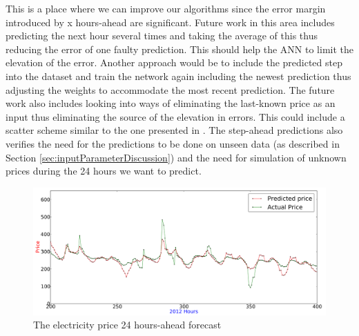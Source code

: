 This is a place where we can improve our algorithms since the error margin introduced by x hours-ahead are significant. Future work in this area includes predicting the next hour several times and taking the average of this thus reducing the error of one faulty prediction. This should help the ANN to limit the elevation of the error. Another approach would be to include the predicted step into the dataset and train the network again including the newest prediction thus adjusting the weights to accommodate the most recent prediction. The future work also includes looking into ways of eliminating the last-known price as an input thus eliminating the source of the elevation in errors. This could include a scatter scheme similar to the one presented in \cite{singhal2011electricity}. The step-ahead predictions also verifies the need for the predictions to be done on unseen data (as described in Section \ref{sec:inputParameterDiscussion}) and the need for simulation of unknown prices during the 24 hours we want to predict. 

\begin{figure}[H]
\centering
\includegraphics[width=0.99\linewidth]{billeder/Discussion/24HourAhead_Price.png}
\caption{The electricity price 24 hours-ahead forecast}
\label{fig:24HourAheadPrice_Discussion}
\end{figure}

